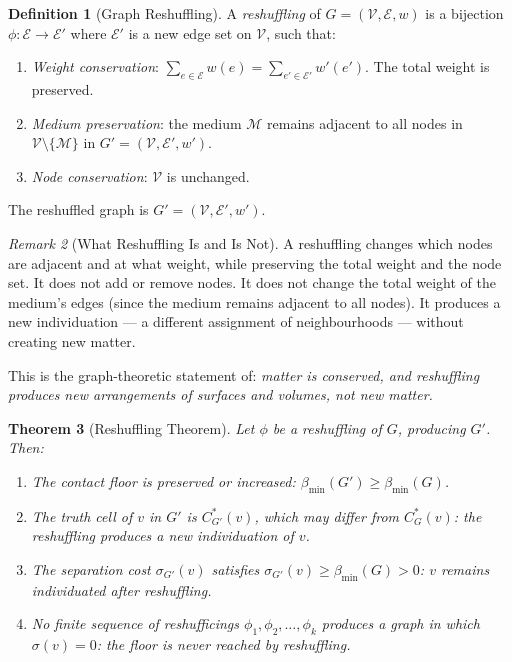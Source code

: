 \documentclass[11pt,twocolumn,a4paper]{article}
\theoremstyle{plain}
\newtheorem{theorem}{Theorem}[section]
\theoremstyle{definition}
\newtheorem{definition}[theorem]{Definition}
\theoremstyle{remark}
\newtheorem{remark}[theorem]{Remark}
\newcommand{\med}{\mathcal{M}}
\newcommand{\Ecal}{\mathcal{E}}
\newcommand{\Vcal}{\mathcal{V}}
\newcommand{\bmin}{\beta_{\min}}
\begin{document}
\begin{definition}[Graph Reshuffling]
\label{def:reshuffling}
A \emph{reshuffling} of $G = (\Vcal, \Ecal, w)$ is a bijection
$\phi: \Ecal \to \Ecal'$ where $\Ecal'$ is a new edge set on $\Vcal$,
such that:
\begin{enumerate}[label=(\roman*)]
  \item \emph{Weight conservation}: $\sum_{e \in \Ecal} w(e) = \sum_{e'
  \in \Ecal'} w'(e')$. The total weight is preserved.
  \item \emph{Medium preservation}: the medium $\med$ remains adjacent to
  all nodes in $\Vcal \setminus \{\med\}$ in $G' = (\Vcal, \Ecal', w')$.
  \item \emph{Node conservation}: $\Vcal$ is unchanged.
\end{enumerate}
The reshuffled graph is $G' = (\Vcal, \Ecal', w')$.
\end{definition}

\begin{remark}[What Reshuffling Is and Is Not]
A reshuffling changes which nodes are adjacent and at what weight, while
preserving the total weight and the node set. It does not add or remove
nodes. It does not change the total weight of the medium's edges (since
the medium remains adjacent to all nodes). It produces a new individuation
--- a different assignment of neighbourhoods --- without creating new matter.

This is the graph-theoretic statement of: \emph{matter is conserved, and
reshuffling produces new arrangements of surfaces and volumes, not new matter.}
\end{remark}

\begin{theorem}[Reshuffling Theorem]
\label{thm:reshuffling}
Let $\phi$ be a reshuffling of $G$, producing $G'$. Then:
\begin{enumerate}[label=(\roman*)]
  \item The contact floor is preserved or increased: $\bmin(G') \geq \bmin(G)$.
  \item The truth cell of $v$ in $G'$ is $C^*_{G'}(v)$, which may differ from
  $C^*_G(v)$: the reshuffling produces a new individuation of $v$.
  \item The separation cost $\sigma_{G'}(v)$ satisfies $\sigma_{G'}(v) \geq
  \bmin(G) > 0$: $v$ remains individuated after reshuffling.
  \item No finite sequence of reshufficings $\phi_1, \phi_2, \ldots, \phi_k$
  produces a graph in which $\sigma(v) = 0$: the floor is never reached by
  reshuffling.
\end{enumerate}
\end{theorem}
\end{document}
